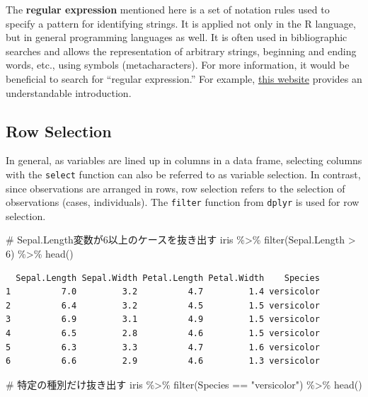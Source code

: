 \documentclass[
  a4paper,
]{book}
\newenvironment{Shaded}{\begin{snugshade}}{\end{snugshade}}
\newcommand{\CommentTok}[1]{\textcolor[rgb]{0.37,0.37,0.37}{#1}}
\newcommand{\DecValTok}[1]{\textcolor[rgb]{0.68,0.00,0.00}{#1}}
\newcommand{\FunctionTok}[1]{\textcolor[rgb]{0.28,0.35,0.67}{#1}}
\newcommand{\NormalTok}[1]{\textcolor[rgb]{0.00,0.23,0.31}{#1}}
\newcommand{\SpecialCharTok}[1]{\textcolor[rgb]{0.37,0.37,0.37}{#1}}
\newcommand{\StringTok}[1]{\textcolor[rgb]{0.13,0.47,0.30}{#1}}
\begin{document}
The \textbf{regular expression} mentioned here is a set of notation
rules used to specify a pattern for identifying strings. It is applied
not only in the R language, but in general programming languages as
well. It is often used in bibliographic searches and allows the
representation of arbitrary strings, beginning and ending words, etc.,
using symbols (metacharacters). For more information, it would be
beneficial to search for ``regular expression.'' For example,
\href{https://userweb.mnet.ne.jp/nakama/}{this website} provides an
understandable introduction.

\subsection{Row Selection}\label{row-selection}

In general, as variables are lined up in columns in a data frame,
selecting columns with the \texttt{select} function can also be referred
to as variable selection. In contrast, since observations are arranged
in rows, row selection refers to the selection of observations (cases,
individuals). The \texttt{filter} function from \texttt{dplyr} is used
for row selection.

\begin{Shaded}
\begin{Highlighting}[]
\CommentTok{\# Sepal.Length変数が6以上のケースを抜き出す}
\NormalTok{iris }\SpecialCharTok{\%\textgreater{}\%}
  \FunctionTok{filter}\NormalTok{(Sepal.Length }\SpecialCharTok{\textgreater{}} \DecValTok{6}\NormalTok{) }\SpecialCharTok{\%\textgreater{}\%}
  \FunctionTok{head}\NormalTok{()}
\end{Highlighting}
\end{Shaded}

\begin{verbatim}
  Sepal.Length Sepal.Width Petal.Length Petal.Width    Species
1          7.0         3.2          4.7         1.4 versicolor
2          6.4         3.2          4.5         1.5 versicolor
3          6.9         3.1          4.9         1.5 versicolor
4          6.5         2.8          4.6         1.5 versicolor
5          6.3         3.3          4.7         1.6 versicolor
6          6.6         2.9          4.6         1.3 versicolor
\end{verbatim}

\begin{Shaded}
\begin{Highlighting}[]
\CommentTok{\# 特定の種別だけ抜き出す}
\NormalTok{iris }\SpecialCharTok{\%\textgreater{}\%}
  \FunctionTok{filter}\NormalTok{(Species }\SpecialCharTok{==} \StringTok{"versicolor"}\NormalTok{) }\SpecialCharTok{\%\textgreater{}\%}
  \FunctionTok{head}\NormalTok{()}
\end{Highlighting}
\end{Shaded}
\end{document}
